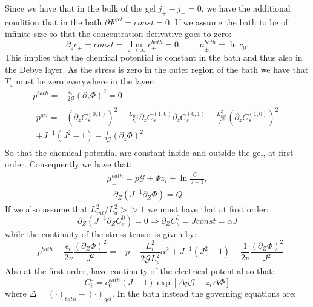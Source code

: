 Since we have that in the bulk of the gel $j_+-j_-=0$, we have the additional condition that in the bath $\partial \Phi^{gel}=const=0$.
If we assume the bath to be of infinite size so that the concentration derivative goes to zero:
\begin{equation}
\partial_z c_\pm = const = \lim\limits_{z \rightarrow \infty} c^{bath}_\pm=0, \qquad \mu^{bath}_\pm = \ln c_0.
\end{equation}
This implies that the chemical potential is constant in the bath and thus also in the Debye layer. 
As the stress is zero in the outer region of the bath we have that $T_z$ must be zero everywhere in the layer:
\begin{gather}
p^{bath}= -\frac{\epsilon_r}{2\mathcal{G}} (\partial_z \Phi)^2 = 0 \\
\begin{aligned}
p^{gel}=-(\partial_z C^{(0,1)}_s)^2-\frac{L_{int}}{L}\partial_{z} C^{(1,0)}_s\partial_{z} C^{(0,1)}_s-\frac{L_{int}^2}{L^2}(\partial_{z} C^{(1,0)}_s)^2 \\+ J^{-1}(J^2-1)-\frac{1}{2\mathcal{G}} (\partial_z \Phi)^2
\end{aligned}
\end{gather}
So that the chemical potential are constant inside and outside the gel, at first order. Consequently we have that:
\begin{gather}
\mu^{bath}_\pm = p \mathcal{G}+ \Phi z_i + \ln \frac{C_\pm}{J-1} ,\\
- \partial_Z (J^{-1}\partial_Z\Phi) = Q\, 
\end{gather}
If we also assume that $L_{int}^2/L^2_d>>1$ we must have that at first order:
\begin{equation}
\partial_Z(J^{-1}\partial_ZC^0_s)=0 \Rightarrow \partial_Z C^0_s = J const = \alpha J 
\end{equation}
while the continuity of the stress tensor is given by:
\begin{equation}
-p^{bath}-\frac{\epsilon_r}{2v}\frac{(\partial_Z \Phi)^2}{J^2}=-p - \frac{L^2_i}{2\mathcal{G}L_p^2} \alpha^2 + J^{-1}\left(J^2-1\right)-\frac{1}{2v}\frac{(\partial_Z \Phi)^2}{J^2}
\end{equation}
Also at the first order, have continuity of the electrical potential so that:
\begin{equation}
C^0_i = c^{bath}_0(J-1) \exp\left[\Delta p\mathcal{G}-z_i\Delta \Phi\right]
\end{equation}
where $\Delta=(\cdot)_{bath}-(\cdot)_{gel}$.
In the bath instead the governing equations are:
